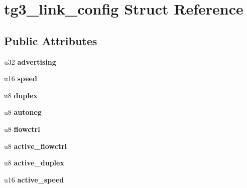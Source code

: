 \hypertarget{structtg3__link__config}{
\section{tg3\_\-link\_\-config Struct Reference}
\label{structtg3__link__config}
}
\subsection*{Public Attributes}
\begin{DoxyCompactItemize}
\item 
\hypertarget{structtg3__link__config_a9e0fdd94addc0458a9c24ef484c728be}{
u32 {\bfseries advertising}}
\label{structtg3__link__config_a9e0fdd94addc0458a9c24ef484c728be}

\item 
\hypertarget{structtg3__link__config_a81bdaea1ff569ed54bf6583afc3b062d}{
u16 {\bfseries speed}}
\label{structtg3__link__config_a81bdaea1ff569ed54bf6583afc3b062d}

\item 
\hypertarget{structtg3__link__config_ac6d316103c5e8a9d6669a7111975dfc8}{
u8 {\bfseries duplex}}
\label{structtg3__link__config_ac6d316103c5e8a9d6669a7111975dfc8}

\item 
\hypertarget{structtg3__link__config_aa98736f7a9bddefd2b1ee2db5dd26ed1}{
u8 {\bfseries autoneg}}
\label{structtg3__link__config_aa98736f7a9bddefd2b1ee2db5dd26ed1}

\item 
\hypertarget{structtg3__link__config_a97822880c06b23fc76c49d782822e848}{
u8 {\bfseries flowctrl}}
\label{structtg3__link__config_a97822880c06b23fc76c49d782822e848}

\item 
\hypertarget{structtg3__link__config_abb476750d127600ebc4b1bbb85d6d6ff}{
u8 {\bfseries active\_\-flowctrl}}
\label{structtg3__link__config_abb476750d127600ebc4b1bbb85d6d6ff}

\item 
\hypertarget{structtg3__link__config_ac2715123b642806aaf70f4944889a4a2}{
u8 {\bfseries active\_\-duplex}}
\label{structtg3__link__config_ac2715123b642806aaf70f4944889a4a2}

\item 
\hypertarget{structtg3__link__config_a6962d5d230e5db92628c67e81afa63cc}{
u16 {\bfseries active\_\-speed}}
\label{structtg3__link__config_a6962d5d230e5db92628c67e81afa63cc}


\end{DoxyCompactItemize}
